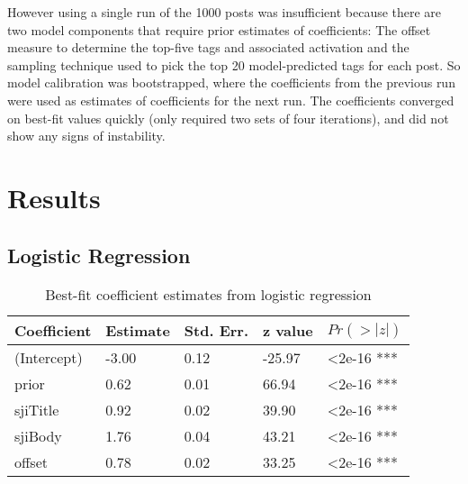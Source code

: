 \documentclass[10pt,letterpaper]{article}
\begin{document}
However using a single run of the \num{1000} posts was insufficient because there are two model components that require prior estimates of coefficients:
The offset measure to determine the top-five tags and associated activation and the sampling technique used to pick the top 20 model-predicted tags for each post.
So model calibration was bootstrapped, where the coefficients from the previous run were used as estimates of coefficients for the next run.
The coefficients converged on best-fit values quickly (only required two sets of four iterations), and did not show any signs of instability.

\section{Results}

\subsection{Logistic Regression}

\vspace{-1em}

\renewcommand{\arraystretch}{1}
\renewcommand{\tabcolsep}{1mm}
\begin{table}[!ht]
  \begin{center}
    \caption{Best-fit coefficient estimates from logistic regression}
    \label{tab:coeffs}
    \vskip 0.12in
    \begin{tabular}{lllll}
      \hline
      Coefficient & 	Estimate &	Std. Err. &	z value &	$Pr(>|z|)$  \\
      \hline
      (Intercept) &	-3.00 &		0.12 &		-25.97 &	\textless2e-16 *** \\
      prior &		0.62 & 		0.01 &		66.94 & 	\textless2e-16 *** \\
      sjiTitle &	0.92 &		0.02 &		39.90 &		\textless2e-16 *** \\
      sjiBody &		1.76 &		0.04 &		43.21 &		\textless2e-16 *** \\
      offset &		0.78 &		0.02 &		33.25 &		\textless2e-16 *** \\
      \hline
    \end{tabular}
  \end{center}
\end{table}
\end{document}
